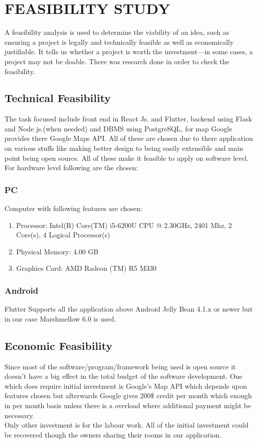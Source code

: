 \chapter{FEASIBILITY STUDY}
A feasibility analysis is used to determine the viability of an idea, such as ensuring a project is legally and technically feasible as well as economically justifiable. It tells us whether a project is worth the investment—in some cases, a project may not be doable. There was research done in order to check the feasibility.
\section{Technical Feasibility}
The task focused include front end in React Js. and Flutter, backend using Flask and Node js.(when needed) and DBMS using PostgreSQL, for map Google provides there Google Maps API. All of these are chosen due to there application on various stuffs like making better design to being easily extensible and main point being open source. All of these make it feasible to apply on software level. For hardware level following are the chosen:
\subsection{PC}
Computer with following features are chosen:
\begin{enumerate}[label=(\alph*)]
	\item Processor:	Intel(R) Core(TM) i5-6200U CPU @ 2.30GHz, 2401 Mhz, 2 Core(s), 4 Logical Processor(s)
	\item Physical Memory: 4.00 GB
	\item Graphics Card: AMD Radeon (TM) R5 M330
\end{enumerate}
\subsection{Android}
Flutter Supports all the application above Android Jelly Bean 4.1.x or newer but in our case Marshmellow 6.0 is used.
\section{Economic Feasibility}
Since most of the software/program/framework being used is open source it doesn't have a big effect in the total budget of the software development. One which does require initial investment is Google's Map API which depends upon features chosen but afterwards Google gives 200\$ credit per month which enough in per month basis unless there is a overload where additional payment might be necessary. \\
Only other investment is for the labour work. All of the initial investment could be recovered though the owners sharing their rooms in our application.
